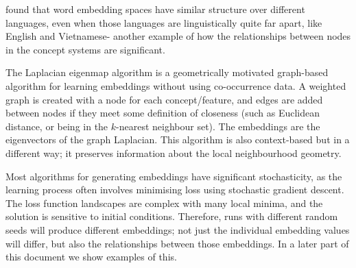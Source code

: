 
\cite{MikolovMachineTranslation} found that word embedding spaces have similar structure over different languages, even when those languages are linguistically quite far apart, like English and Vietnamese- another example of how the relationships between nodes in the concept systems are significant. 

The Laplacian eigenmap algorithm \cite{LaplacianEigenmaps} is a geometrically motivated graph-based algorithm for learning embeddings without using co-occurrence data. A weighted graph is created with a node for each concept/feature, and edges are added between nodes if they meet some definition of closeness (such as Euclidean distance, or being in the $k$-nearest neighbour set). The embeddings are the eigenvectors of the graph Laplacian. This algorithm is also context-based but in a different way; it preserves information about the local neighbourhood geometry. 

Most algorithms for generating embeddings have significant stochasticity, as the learning process often involves minimising loss using stochastic gradient descent. The loss function landscapes are complex with many local minima, and the solution is sensitive to initial conditions. Therefore, runs with different random seeds will produce different embeddings; not just the individual embedding values will differ, but also the relationships between those embeddings. In a later part of this document we show examples of this. 

